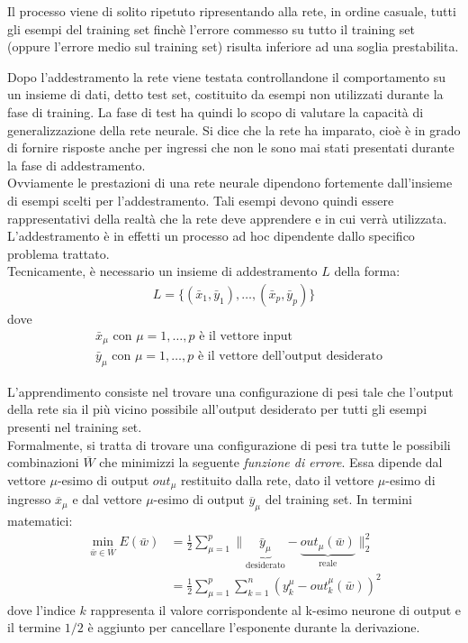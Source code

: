 Il processo viene di solito ripetuto ripresentando alla rete, in ordine casuale, tutti gli esempi del training set finchè l’errore commesso su tutto il training set (oppure l’errore medio sul training set) risulta inferiore ad una soglia prestabilita.

\newpage

Dopo l’addestramento la rete viene testata controllandone il comportamento su un insieme di dati, detto test set, costituito da esempi non utilizzati durante la fase di training. La fase di test ha quindi lo scopo di valutare la capacità di generalizzazione della rete neurale. Si dice che la rete ha imparato, cioè è in grado di fornire risposte anche per ingressi che non le sono mai stati presentati durante la fase di addestramento.\\

Ovviamente le prestazioni di una rete neurale dipendono fortemente dall’insieme di esempi scelti per l’addestramento. Tali esempi devono quindi essere rappresentativi della realtà che la rete deve apprendere e in cui verrà utilizzata. L’addestramento è in effetti un processo ad hoc dipendente dallo specifico problema trattato.\\

Tecnicamente, è necessario un insieme di addestramento $L$ della forma: 
\begin{align}
	L = \{(\bar{x}_1, \bar{y}_1), \dots, (\bar{x}_p, \bar{y}_p) \}
\end{align}
dove
\begin{align*}
	&\bar{x}_\mu \mbox{ con $\mu=1, \dots, p$ è il vettore input} \\
	&\bar{y}_\mu \mbox{ con $\mu=1, \dots, p$ è il vettore dell'output desiderato}
\end{align*}

L'apprendimento consiste nel trovare una configurazione di pesi tale che l'output della rete sia il più vicino possibile all'output desiderato per tutti gli esempi presenti nel training set.\\

Formalmente, si tratta di trovare una configurazione di pesi tra tutte le possibili combinazioni $\overline{W}$ che minimizzi la seguente \emph{funzione di errore}. Essa dipende dal vettore $\mu$-esimo di output $out_\mu$ restituito dalla rete, dato il vettore $\mu$-esimo di ingresso $\overline{x}_\mu$ e dal vettore $\mu$-esimo di output $\overline{y}_\mu$ del training set. In termini matematici:
\begin{align*}
	\min_{\bar{w} \in \overline{W}} E(\bar{w}) &= \frac{1}{2} \sum_{\mu=1}^p \| \underbrace{\bar{y}_\mu}_\textrm{desiderato} - \underbrace{out_\mu (\bar{w})}_\textrm{reale} \|_2^2 \\
	&= \frac{1}{2} \sum_{\mu=1}^p \sum_{k=1}^n \left(y_k^\mu - out_k^\mu (\bar{w})\right)^2
\end{align*}
dove l'indice $k$ rappresenta il valore corrispondente al k-esimo neurone di output e il termine $1/2$ è aggiunto per cancellare l'esponente durante la derivazione.

